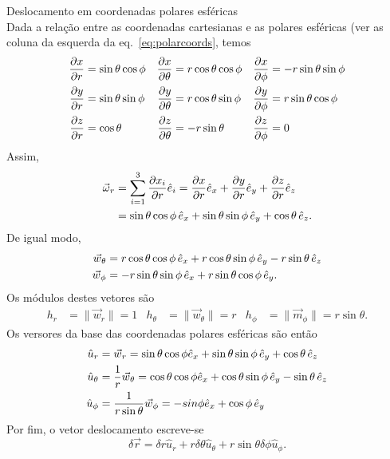 \begin{examples}
\item Deslocamento em coordenadas polares esféricas\\
\label{ex:drsph}
Dada a relação entre as coordenadas cartesianas e as polares esféricas (ver as
coluna da esquerda da eq.~\eqref{eq:polarcoords}, temos
\begin{align*}
\frac{\partial x}{\partial r}&=\sin\theta\cos\phi &
\frac{\partial x}{\partial \theta}&=r\cos\theta\cos\phi &
\frac{\partial x}{\partial \phi}&=-r\sin\theta\sin\phi\\
\frac{\partial y}{\partial r}&=\sin\theta\sin\phi &
\frac{\partial y}{\partial \theta}&=r\cos\theta\sin\phi &
\frac{\partial y}{\partial \phi}&=r\sin\theta\cos\phi\\
\frac{\partial z}{\partial r}&=\cos\theta&
\frac{\partial z}{\partial \theta}&=-r\sin\theta&
\frac{\partial z}{\partial \phi}&=0
\end{align*}
Assim,
\begin{align*}
\vec\omega_r&=\sum_{i=1}^3\pd{x_i}{r}\he_i=
\pd{x}{r}\he_x+
\pd{y}{r}\he_y+
\pd{z}{r}\he_z\\
&=\sin\theta\cos\phi\,\he_x+\sin\theta\sin\phi\,\he_y+\cos\theta\,\he_z.
\end{align*}
De igual modo,
\begin{align*}
\vec w_\theta&=
    r\cos\theta\cos\phi\,\he_x+r\cos\theta\sin\phi\,\he_y-r\sin\theta\,\he_z\\
\vec w_\phi&= -r\sin\theta\sin\phi\,\he_x+r\sin\theta\cos\phi\,\he_y.
\end{align*}
Os módulos destes vetores são
\begin{align*}
h_r&=\|\vec w_r\|=1 &
h_\theta &=\|\vec w_\theta\|=r &
h_\phi&=\|\vec m_\phi\|=r\sin\theta.
\end{align*}
Os versores da base das coordenadas polares esféricas são então
\begin{align*}
\hat u_r&=\vec w_r=
    \sin\theta\cos\phi\he_x+\sin\theta\sin\phi\,\he_y+\cos\theta\,\he_z\\
\hat u_\theta&=\frac{1}{r}\vec w_\theta=
    \cos\theta\cos\phi\he_x+\cos\theta\sin\phi\,\he_y-\sin\theta\,\he_z\\
\hat u_\phi&=\frac{1}{r\sin\theta}\vec w_\phi=
    -sin\phi\he_x+\cos\phi\,\he_y
\end{align*}
Por fim, o vetor deslocamento escreve-se
\begin{equation*}
\delta\vec r = \delta r\hat u_r+ r\delta\theta\hat
u_\theta+r\sin\theta\delta\phi\hat u_\phi.
\end{equation*}
%
\end{examples}


